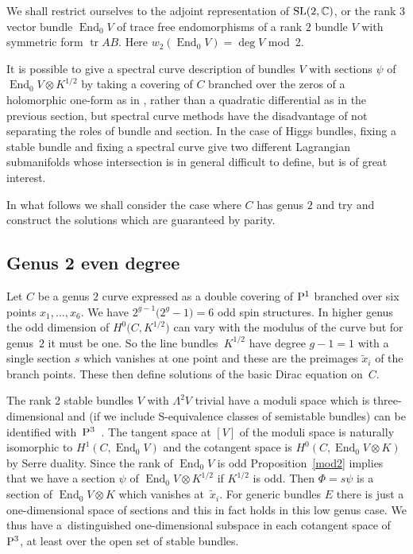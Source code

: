 \documentclass[pdftex]{sigma}
\def\End{\operatorname{End}}
\newcommand{\C}{\mathbb{C}}
\def\tr{\operatorname{tr}}
\newcommand{\PP}{{\rm P}}
\begin{document}
We shall restrict ourselves to the adjoint representation of ${\rm SL}(2,\C)$, or the rank $3$ vector bundle $\End_0V$ of trace free endomorphisms of a rank $2$ bundle $V$ with symmetric form $\tr AB$. Here $w_2(\End_0V)=\deg V$ mod~2.

\begin{remark}
 It is possible to give a spectral curve description of bundles $V$ with sections $\psi$ of $\End_0V\otimes K^{1/2}$ by taking a covering of $C$ branched over the zeros of a holomorphic one-form as in \cite{Oxbury}, rather than a quadratic differential as in the previous section, but spectral curve methods have the disadvantage of not separating the roles of bundle and section. In the case of Higgs bundles, fixing a stable bundle and fixing a spectral curve give two different Lagrangian submanifolds whose intersection is in general difficult to define, but is of great interest.
 \end{remark}
 In what follows we shall consider the case where $C$ has genus $2$ and try and construct the solutions which are guaranteed by parity.

\subsection{Genus 2 even degree}\label{section4.2}
Let $C$ be a genus $2$ curve expressed as a double covering of $\PP^1$ branched over six points $x_1,\dots, x_6$. We have $2^{g-1}\big(2^g-1\big)=6$ odd spin structures. In higher genus the odd dimension of $H^0\big(C,K^{1/2}\big)$ can vary with the modulus of the curve but for genus~$2$ it must be one. So the line bundles~$K^{1/2}$ have degree $g-1=1$ with a single section $s$ which vanishes at one point and these are the preimages $\tilde x_i$ of the branch points. These then define solutions of the basic Dirac equation on~$C$.

The rank 2 stable bundles $V$ with $\Lambda^2V$ trivial have a moduli space which is three-dimensional and (if we include S-equivalence classes of semistable bundles) can be identified with~$\PP^3$~\cite{NarasimhanM/RamananS}. The tangent space at $[V]$ of the moduli space is naturally isomorphic to $H^1(C, \End_0V)$ and the cotangent space is $H^0(C, \End_0V\otimes K)$ by Serre duality. Since the rank of $\End_0V$ is odd Proposition~\ref{mod2} implies that we have a section $\psi$ of $\End_0V\otimes K^{1/2}$ if $K^{1/2}$ is odd. Then $\Phi=s\psi$ is a section of $\End_0V\otimes K$ which vanishes at~$\tilde x_i$. For generic bundles $E$ there is just a one-dimensional space of sections and this in fact holds in this low genus case.
 We thus have a~distinguished one-dimensional subspace in each cotangent space of~$\PP^3$, at least over the open set of stable bundles.
\end{document}
